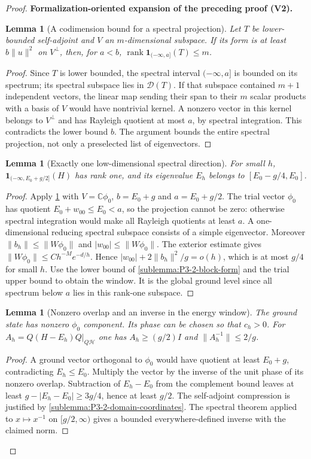 \documentclass[11pt]{article}
\newtheorem{lemma}[theorem]{Lemma}
\newcommand{\formalisationparentid}{X}
\newenvironment{formalisationaddition}[1]{\par\medskip\begingroup\color{blue}\def\formalisationparentid{#1}\setcounter{formalizationsublemma}{0}\let\lemma\formalizationsublemma\let\endlemma\endformalizationsublemma
  \def\Eo{\mathcal E_h^\circ}\def\EE{\mathcal E_h}\def\phio{\phi_h^\circ}\def\phih{\phi_h}\def\Ho{H_h^{\rm atom}(v^\circ)}\def\Ha{H_h^{\rm atom}}\def\HL{H_h^{L}}\def\Dh{D_h}\def\Log{\operatorname{Log}}\def\ellh{\ell_h}\def\Gp{G_{p,h}}\def\Ast{A_{*,h}}\def\ahat{\widehat{\mathfrak a}_h}\def\ah{\mathfrak a_h}\def\rh{\widehat\rho_h}\def\deltah{\widehat\delta_h}\def\oldref##1{\textup{(##1)}}\def\interface##1{\par\noindent\textit{Analytical interface used here.} ##1\par}\def\finish{\par\noindent\textit{Conclusion of the formalization-oriented expansion.} }\par\noindent\textbf{Formalization-oriented expansion of the preceding proof (V2).}\par\smallskip
}{\par\endgroup\medskip
}
\newcommand{\C}{\mathbb C}
\begin{document}
\begin{proof}
\begin{formalisationaddition}{P3.2}
\begin{lemma}[A codimension bound for a spectral projection]\label{sublemma:P3-2-spectral-rank-bound}
Let $T$ be lower-bounded self-adjoint and $V$ an $m$-dimensional subspace.
If its form is at least $b\|u\|^2$ on $V^\perp$, then, for $a<b$,
$\operatorname{rank}\mathbf1_{(-\infty,a]}(T)\le m$.
\end{lemma}
\begin{proof}
Since $T$ is lower bounded, the spectral interval $(-\infty,a]$ is bounded
on its spectrum; its spectral subspace lies in $\mathcal D(T)$.
If that subspace contained $m+1$ independent vectors, the linear map
sending their span to their $m$ scalar products with a basis of $V$
would have nontrivial kernel. A nonzero vector in this kernel belongs to
$V^\perp$ and has Rayleigh quotient at most $a$, by spectral integration.
This contradicts the lower bound $b$. The argument bounds the entire
spectral projection, not only a preselected list of eigenvectors.
\end{proof}

\begin{lemma}[Exactly one low-dimensional spectral direction]\label{sublemma:P3-2-rank-one}
For small $h$, $\mathbf1_{(-\infty,E_0+g/2]}(H)$ has rank one, and its
eigenvalue $E_h$ belongs to $[E_0-g/4,E_0]$.
\end{lemma}
\begin{proof}
Apply \ref{sublemma:P3-2-spectral-rank-bound} with $V=\C\phi_0$,
$b=E_0+g$ and $a=E_0+g/2$. The trial vector $\phi_0$ has quotient
$E_0+w_{00}\le E_0<a$, so the projection cannot be zero: otherwise
spectral integration would make all Rayleigh quotients at least $a$.
A one-dimensional reducing spectral subspace consists of a simple
eigenvector. Moreover
$\|b_h\|\le\|W\phi_0\|$ and
$|w_{00}|\le\|W\phi_0\|$. The exterior estimate gives
$\|W\phi_0\|\le Ch^{-M}e^{-d/h}$. Hence
$|w_{00}|+2\|b_h\|^2/g=o(h)$, which is at most $g/4$ for small $h$.
Use the lower bound of \ref{sublemma:P3-2-block-form} and the trial upper
bound to obtain the window. It is the global ground level since all
spectrum below $a$ lies in this rank-one subspace.
\end{proof}

\begin{lemma}[Nonzero overlap and an inverse in the energy window]\label{sublemma:P3-2-overlap-inverse}
The ground state has nonzero $\phi_0$ component. Its phase can be chosen
so that $c_h>0$. For
$A_h=Q(H-E_h)Q|_{Q\mathcal H}$ one has
$A_h\ge(g/2)I$ and $\|A_h^{-1}\|\le2/g$.
\end{lemma}
\begin{proof}
A ground vector orthogonal to $\phi_0$ would have quotient at least
$E_0+g$, contradicting $E_h\le E_0$. Multiply the vector by the inverse
of the unit phase of its nonzero overlap. Subtraction of $E_h-E_0$
from the complement bound leaves at least $g-|E_h-E_0|\ge3g/4$,
hence at least $g/2$. The self-adjoint compression is justified by
\ref{sublemma:P3-2-domain-coordinates}. The spectral theorem applied to
$x\mapsto x^{-1}$ on $[g/2,\infty)$ gives a bounded everywhere-defined
inverse with the claimed norm.
\end{proof}


\end{formalisationaddition}
\end{proof}
\end{document}
